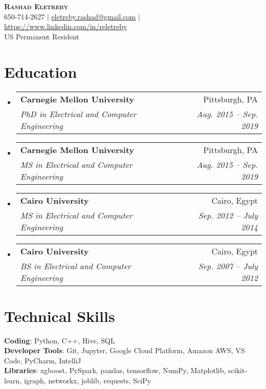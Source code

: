 \documentclass[letterpaper,11pt]{article}
\makeatletter
\newcommand{\resumeSubheading}[4]{
  \vspace{-2pt}\item
    \begin{tabular*}{0.97\textwidth}[t]{l@{\extracolsep{\fill}}r}
      \textbf{#1} & #2 \\
      \textit{\small#3} & \textit{\small #4} \\
    \end{tabular*}\vspace{-7pt}
}
\newcommand{\resumeSubHeadingListStart}{\begin{itemize}[leftmargin=0.15in, label={}]}
\newcommand{\resumeSubHeadingListEnd}{\end{itemize}}
\makeatother
\begin{document}

\begin{center}
    \textbf{\Huge \scshape Rashad Eletreby} \\ \vspace{1pt}
    \small 650-714-2627 $|$ \href{mailto:eletreby.rashad@gmail.com}{\underline{eletreby.rashad@gmail.com}} $|$ 
    \href{https://www.linkedin.com/in/reletreby}{\underline{https://www.linkedin.com/in/reletreby}} 
    \\ \vspace{3mm}
    \small US Permanent Resident
    \end{center}


\section{Education}
  \resumeSubHeadingListStart
    \resumeSubheading
      {Carnegie Mellon University}{Pittsburgh, PA}
      {PhD in Electrical and Computer Engineering}{Aug. 2015 -- Sep. 2019}
      
     \vspace{1mm}
    \resumeSubheading
      {Carnegie Mellon University}{Pittsburgh, PA}
      {MS in Electrical and Computer Engineering}{Aug. 2015 -- Sep. 2019}
      
       \vspace{1mm}
    \resumeSubheading
      {Cairo University}{Cairo, Egypt}
      {MS in Electrical and Computer Engineering}{Sep. 2012 -- July 2014}
      
      \vspace{1mm}
    \resumeSubheading
      {Cairo University}{Cairo, Egypt}
      {BS in Electrical and Computer Engineering}{Sep. 2007 -- July 2012}
  \resumeSubHeadingListEnd


\vspace{1mm}
\section{Technical Skills}
 \begin{itemize}[leftmargin=0.15in, label={}]
    \small{\item{
     \textbf{Coding}{: Python, C++, Hive, SQL} \\
     \textbf{Developer Tools}{: Git, Jupyter, Google Cloud Platform, Amazon AWS, VS Code, PyCharm, IntelliJ} \\
     \textbf{Libraries}{: xgboost, PySpark, pandas, tensorflow, NumPy, Matplotlib, scikit-learn, igraph, networkx, joblib, requests, SciPy}
    }}
 \end{itemize}
 
\end{document}
